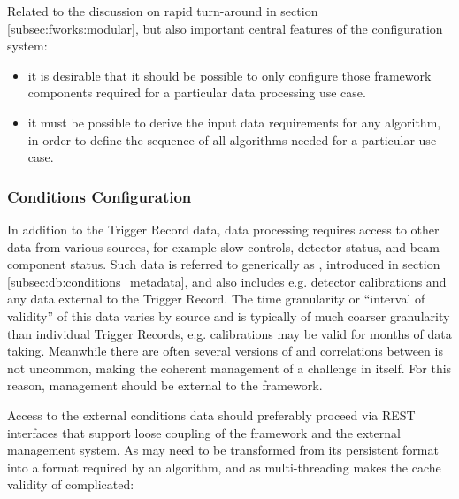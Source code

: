 \documentclass[../main-v1.tex]{subfiles}
\begin{document}


Related to the discussion on rapid turn-around in section \ref{subsec:fworks:modular}, but also important central features of the configuration system:

\begin{itemize}
\item it is desirable that it should be possible to only configure those framework components required for a particular data processing use case.  


\item it must be possible to derive the input data requirements for any algorithm, in order to define the sequence of all algorithms needed for a particular use case.
\end{itemize}
 
\subsubsection{Conditions Configuration}

In addition to the Trigger Record data, data processing requires access to other data from various sources, for example slow controls, detector status, and beam component status.  Such data is referred to generically as , introduced in section \ref{subsec:db:conditions_metadata}, and also includes e.g. detector calibrations and any data external to the Trigger Record.  The time granularity or “interval of validity” of this data varies by source and is typically of much coarser granularity than individual Trigger Records, e.g. calibrations may be valid for months of data taking.  Meanwhile there are often several versions of  and correlations between  is not uncommon, making the coherent management of  a challenge in itself.  For this reason,  management should be external to the framework.

Access to the external conditions data should preferably proceed via REST interfaces that support loose coupling of the framework and the external  management system.  As  may need to be transformed from its persistent format into a format required by an algorithm, and as multi-threading makes the cache validity of  complicated: 
\end{document}

